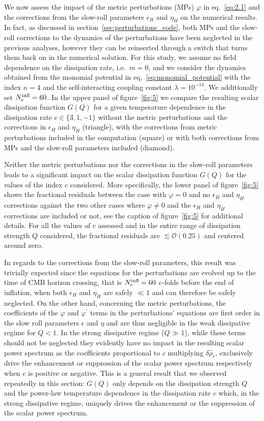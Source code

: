 \documentclass[a4paper,11pt]{article}
\begin{document}
We now assess the impact of the metric perturbations (MPs) $\varphi$ in eq.~\eqref{eq:2.1} and the corrections from the slow-roll parameters $\epsilon_H$ and $\eta_H$ on the numerical results. In fact, as discussed in section~\ref{sec:perturbations_code}, both MPs and the slow-roll corrections to the dynamics of the perturbations have been neglected in the previous analyses, however they can be reinserted through a switch that turns them back on in the numerical solution.
For this study, we assume no field dependence on the dissipation rate, i.e.\ $m=0$, and we consider the dynamics obtained from the monomial potential in eq.~\eqref{eq:monomial_potential} with the index $n=4$ and the self-interacting coupling constant $\lambda=10^{-14}$. We additionally set $N_e^{\rm infl}=60$. In the upper panel of figure~\ref{fig:5} we compare the resulting scalar dissipation function $G(Q)$ for a given temperature dependence in the dissipation rate $c\in\{3,1,-1\}$ without the metric perturbations and the corrections in $\epsilon_H$ and $\eta_H$ (triangle), with the corrections from metric perturbations included in the computation (square) or with both corrections from MPs and the slow-roll parameters included (diamond).

Neither the metric perturbations nor the corrections in the slow-roll parameters leads to a significant impact on the scalar dissipation function $G(Q)$ for the values of the index $c$ considered. More specifically, the lower panel of figure~\ref{fig:5} shows the fractional residuals between the case with $\varphi=0$ and no $\epsilon_H$ and $\eta_H$ corrections against the two other cases where $\varphi\neq 0$ and the $\epsilon_H$ and $\eta_H$ corrections are included or not, see the caption of figure~\ref{fig:5} for additional details. For all the values of $c$ assessed and in the entire range of dissipation strength $Q$ considered, the fractional residuals are $\lesssim\mathcal{O}(0.25)$ and centered around zero.


In regards to the corrections from the slow-roll parameters, this result was trivially expected since the equations for the perturbations are evolved up to the time of CMB horizon crossing, that is $N_e^{\rm{infl}}=60$ $e$-folds before the end of inflation, when both $\epsilon_H$ and $\eta_H$ are safely $\ll 1$  and can therefore be safely neglected. On the other hand, concerning the metric perturbations, the coefficients of the $\varphi$ and $\varphi^\prime$ terms in the perturbations' equations are first order in the slow roll parameters $\epsilon$ and $\eta$ and are thus negligible in the weak dissipative regime for $Q<1$. In the strong dissipative regime ($Q\gg 1$), while these terms should not be neglected they evidently have no impact in the resulting scalar power spectrum as the coefficients proportional to $c$ multiplying $\delta\hat{\rho}_r$, exclusively drive the enhancement or suppression of the scalar power spectrum respectively when $c$ is positive or negative. This is a general result that we observed repeatedly in this section: $G(Q)$ only depends on the dissipation strength $Q$ and the power-law temperature dependence in the dissipation rate $c$ which, in the strong dissipative regime, uniquely drives the enhancement or the suppression of the scalar power spectrum.
\end{document}
